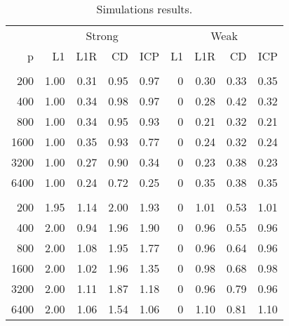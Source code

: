\begin{table}

\caption{Simulations results.  \label{tab:high-dim}}
\centering
\begin{tabular}[t]{rrrrrrrrr}
\toprule
\multicolumn{1}{c}{ } & \multicolumn{4}{c}{Strong} & \multicolumn{4}{c}{Weak} \\
\cmidrule(l{3pt}r{3pt}){2-5} \cmidrule(l{3pt}r{3pt}){6-9}
p & L1 & L1R & CD & ICP & L1 & L1R & CD & ICP\\
\midrule
\addlinespace[0.3em]
\multicolumn{9}{l}{\textbf{$p_0=1$}}\\
\hspace{1em}200 & 1.00 & 0.31 & 0.95 & 0.97 & 0 & 0.30 & 0.33 & 0.35\\
\hspace{1em}400 & 1.00 & 0.34 & 0.98 & 0.97 & 0 & 0.28 & 0.42 & 0.32\\
\hspace{1em}800 & 1.00 & 0.34 & 0.95 & 0.93 & 0 & 0.21 & 0.32 & 0.21\\
\hspace{1em}1600 & 1.00 & 0.35 & 0.93 & 0.77 & 0 & 0.24 & 0.32 & 0.24\\
\hspace{1em}3200 & 1.00 & 0.27 & 0.90 & 0.34 & 0 & 0.23 & 0.38 & 0.23\\
\hspace{1em}6400 & 1.00 & 0.24 & 0.72 & 0.25 & 0 & 0.35 & 0.38 & 0.35\\
\addlinespace[0.3em]
\multicolumn{9}{l}{\textbf{$p_0=2$}}\\
\hspace{1em}200 & 1.95 & 1.14 & 2.00 & 1.93 & 0 & 1.01 & 0.53 & 1.01\\
\hspace{1em}400 & 2.00 & 0.94 & 1.96 & 1.90 & 0 & 0.96 & 0.55 & 0.96\\
\hspace{1em}800 & 2.00 & 1.08 & 1.95 & 1.77 & 0 & 0.96 & 0.64 & 0.96\\
\hspace{1em}1600 & 2.00 & 1.02 & 1.96 & 1.35 & 0 & 0.98 & 0.68 & 0.98\\
\hspace{1em}3200 & 2.00 & 1.11 & 1.87 & 1.18 & 0 & 0.96 & 0.79 & 0.96\\
\hspace{1em}6400 & 2.00 & 1.06 & 1.54 & 1.06 & 0 & 1.10 & 0.81 & 1.10\\
\bottomrule
\end{tabular}
\end{table}
